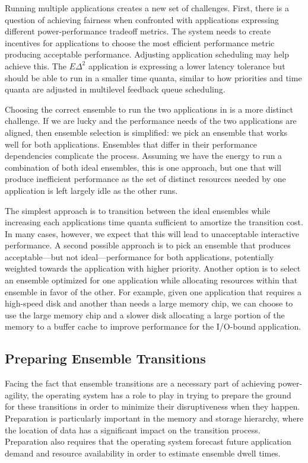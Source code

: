 Running multiple applications creates a new set of challenges. First, there
is a question of achieving fairness when confronted with applications
expressing different power-performance tradeoff metrics. The system needs to
create incentives for applications to choose the most efficient performance
metric producing acceptable performance. Adjusting application scheduling may
help achieve this. The $E\Delta^2$ application is expressing a lower latency
tolerance but should be able to run in a smaller time quanta, similar to how
priorities and time quanta are adjusted in multilevel feedback queue
scheduling.

Choosing the correct ensemble to run the two applications in is a more
distinct challenge. If we are lucky and the performance needs of the two
applications are aligned, then ensemble selection is simplified: we pick an
ensemble that works well for both applications. Ensembles that differ in
their performance dependencies complicate the process. Assuming we have the
energy to run a combination of both ideal ensembles, this is one approach,
but one that will produce inefficient performance as the set of distinct
resources needed by one application is left largely idle as the other runs.

The simplest approach is to transition between the ideal ensembles while
increasing each applications time quanta sufficient to amortize the
transition cost. In many cases, however, we expect that this will lead to
unacceptable interactive performance. A second possible approach is to pick
an ensemble that produces acceptable---but not ideal---performance for
both applications, potentially weighted towards the application with higher
priority. Another option is to select an ensemble optimized for one
application while allocating resources within that ensemble in favor of the
other. For example, given one application that requires a high-speed disk and
another than needs a large memory chip, we can choose to use the large memory
chip and a slower disk allocating a large portion of the memory to a buffer
cache to improve performance for the I/O-bound application.

\subsection{Preparing Ensemble Transitions}

Facing the fact that ensemble transitions are a necessary part of achieving
power-agility, the operating system has a role to play in trying to prepare
the ground for these transitions in order to minimize their disruptiveness
when they happen. Preparation is particularly important in the memory and
storage hierarchy, where the location of data has a significant impact on the
transition process. Preparation also requires that the operating system
forecast future application demand and resource availability in order to
estimate ensemble dwell times.

